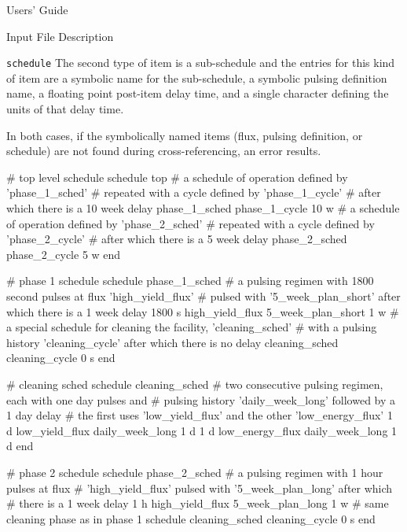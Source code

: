 \begin{chapter}{Users' Guide\label{app:user.guide}}
\begin{section}{Input File Description\label{app:user.input}}
\begin{subsection}{\texttt{schedule}\label{app:user.input.sched}}
      The second type of item is a sub-schedule and the entries for
      this kind of item are a symbolic name for the sub-schedule, a
      symbolic pulsing definition name, a floating point post-item delay
      time, and a single character defining the units of that delay
      time.
      
      In both cases, if the symbolically named items (flux, pulsing
      definition, or schedule) are not found during cross-referencing,
      an error results.

      \begin{center}
        \renewcommand{\baselinestretch}{1}\normalsize
        \begin{boxedverbatim}
# top level schedule
schedule top
    # a schedule of operation defined by 'phase_1_sched' 
    #     repeated with a cycle defined by 'phase_1_cycle'
    #     after which there is a 10 week delay
  phase_1_sched phase_1_cycle 10 w
    # a schedule of operation defined by 'phase_2_sched' 
    #     repeated with a cycle defined by 'phase_2_cycle'
    #     after which there is a 5 week delay
  phase_2_sched phase_2_cycle 5 w
end

# phase 1 schedule
schedule phase_1_sched
    # a pulsing regimen with 1800 second pulses at flux 'high_yield_flux' 
    # pulsed with '5_week_plan_short' after which there is a 1 week delay
  1800 s high_yield_flux 5_week_plan_short 1 w
    # a special schedule for cleaning the facility, 'cleaning_sched'
    # with a pulsing history 'cleaning_cycle' after which there is no delay
  cleaning_sched cleaning_cycle 0 s
end

# cleaning sched
schedule cleaning_sched
    # two consecutive pulsing regimen, each with one day pulses and
    # pulsing history 'daily_week_long' followed by a 1 day delay
    # the first uses 'low_yield_flux' and the other 'low_energy_flux'
  1 d low_yield_flux daily_week_long 1 d
  1 d low_energy_flux daily_week_long 1 d
end

# phase 2 schedule
schedule phase_2_sched
    # a pulsing regimen with 1 hour pulses at flux 
    # 'high_yield_flux' pulsed with '5_week_plan_long' after which
    # there is a 1 week delay
  1 h high_yield_flux 5_week_plan_long 1 w
    # same cleaning phase as in phase 1 schedule
  cleaning_sched cleaning_cycle 0 s
end
\end{boxedverbatim}
      \end{center}

    \end{subsection}


\end{section}
\end{chapter}
